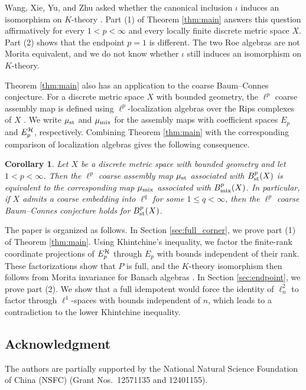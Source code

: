 \documentclass[11pt,reqno]{amsart}
\theoremstyle{definition}
\theoremstyle{plain}
\newtheorem{Cor}[Def]{Corollary}
\begin{document}
Wang, Xie, Yu, and Zhu asked whether the canonical inclusion $\iota$ induces an isomorphism on $K$-theory \cite[Question~3.6]{WXYZ24}. Part (1) of Theorem \ref{thm:main} answers this question affirmatively for every $1<p<\infty$ and every locally finite discrete metric space $X$. Part (2) shows that the endpoint $p=1$ is different. The two Roe algebras are not Morita equivalent, and we do not know whether $\iota$ still induces an isomorphism on $K$-theory.

Theorem \ref{thm:main} also has an application to the coarse Baum--Connes conjecture. For a discrete metric space $X$ with bounded geometry, the $\ell^p$ coarse assembly map is defined using $\ell^p$-localization algebras over the Rips complexes of $X$ \cite{Yu97, Zha21}. We write $\mu_{\textup{st}}$ and $\mu_{\textup{mix}}$ for the assembly maps with coefficient spaces $E_p$ and $E_p^{\mathcal H}$, respectively. Combining Theorem \ref{thm:main} with the corresponding comparison of localization algebras \cite{WXYZ24} gives the following consequence.

\begin{Cor}\label{cor:CBC}
Let $X$ be a discrete metric space with bounded geometry and let $1<p<\infty$. Then the $\ell^p$ coarse assembly map $\mu_{\textup{st}}$ associated with $B^p_{\textup{st}}(X)$ is equivalent to the corresponding map $\mu_{\textup{mix}}$ associated with $B^p_{\textup{mix}}(X)$. In particular, if $X$ admits a coarse embedding into $\ell^q$ for some $1\le q<\infty$, then the $\ell^p$ coarse Baum--Connes conjecture holds for $B^p_{\textup{st}}(X)$.
\end{Cor}


The paper is organized as follows. In Section \ref{sec:full_corner}, we prove part (1) of Theorem \ref{thm:main}. Using Khintchine's inequality, we factor the finite-rank coordinate projections of $E_p^{\mathcal H}$ through $E_p$ with bounds independent of their rank. These factorizations show that $P$ is full, and the $K$-theory isomorphism then follows from Morita invariance for Banach algebras \cite{Laf02, Par09, Par15}. In Section \ref{sec:endpoint}, we prove part (2). We show that a full idempotent would force the identity of $\ell^2_n$ to factor through $\ell^1$-spaces with bounds independent of $n$, which leads to a contradiction to the lower Khintchine inequality.

\subsection*{Acknowledgment}
The authors are partially supported by the National Natural Science Foundation of China (NSFC) (Grant Nos.~12571135 and 12401155).
\end{document}
